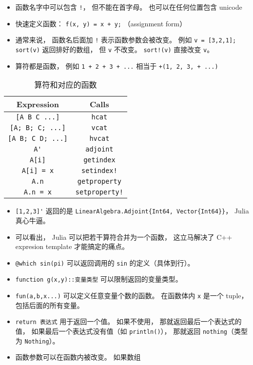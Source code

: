 
\begin{issues}
\issueDraft
\end{issues}

\begin{itemize}
\item 函数名字中可以包含 \verb|!|， 但不能在首字母。 也可以在任何位置包含 unicode
\item 快速定义函数： \verb|f(x, y) = x + y;| （assignment form）
\item 通常来说， 函数名后面加 \verb|!| 表示函数参数会被改变。 例如 \verb|v = [3,2,1]; sort(v)| 返回排好的数组， 但 \verb|v| 不改变。 \verb|sort!(v)| 直接改变 \verb|v|。
\item 算符都是函数， 例如 \verb|1 + 2 + 3 + ...| 相当于 \verb|+(1, 2, 3, + ...)|
\end{itemize}


\begin{table}[ht]
\centering
\caption{算符和对应的函数}\label{tab_JuFunc_1}
\begin{tabular}{|c|c|}
\hline
Expression & Calls \\
\hline
\verb|[A B C ...]| & \verb|hcat| \\
\hline
\verb|[A; B; C; ...]| & \verb|vcat| \\
\hline
\verb|[A B; C D; ...]| & \verb|hvcat| \\
\hline
\verb|A'| & \verb|adjoint| \\
\hline
\verb|A[i]| & \verb|getindex| \\
\hline
\verb|A[i] = x| & \verb|setindex!| \\
\hline
\verb|A.n| & \verb|getproperty| \\
\hline
\verb|A.n = x| & \verb|setproperty!| \\
\hline
\end{tabular}
\end{table}

\begin{itemize}
\item \verb|[1,2,3]'| 返回的是 \verb|LinearAlgebra.Adjoint{Int64, Vector{Int64}}|， Julia 真心牛逼。
\item 可以看出， Julia 可以把若干算符合并为一个函数， 这立马解决了 C++ expresion template 才能搞定的痛点。
\item \verb|@which sin(pi)| 可以返回调用的 \verb|sin| 的定义（具体到行）。
\item \verb|function g(x,y)::变量类型| 可以限制返回的变量类型。
\item \verb|fun(a,b,x...)| 可以定义任意变量个数的函数。 在函数体内 \verb|x| 是一个 tuple， 包括后面的所有变量。
\item \verb|return 表达式| 用于返回一个值。 如果不使用， 那就返回最后一个表达式的值， 如果最后一个表达式没有值（如 \verb|println()|）， 那就返回 \verb|nothing|（类型为 \verb|Nothing|）。
\item 函数参数可以在函数内被改变。 如果数组
\end{itemize}

